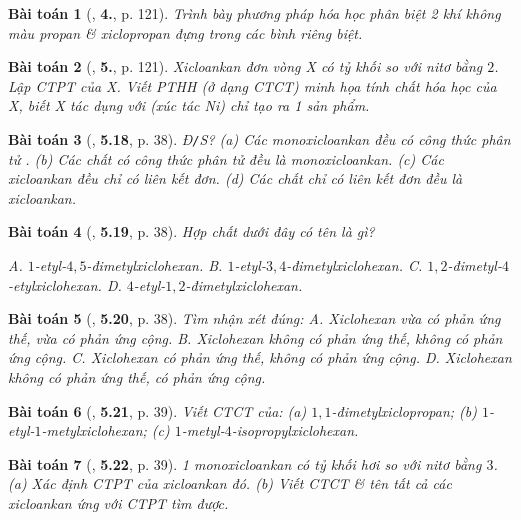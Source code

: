 \documentclass{article}
\numberwithin{equation}{section}
\newtheorem{baitoan}{Bài toán}[section]
\begin{document}
\begin{baitoan}[\cite{SGK_Hoa_Hoc_11_co_ban}, \textbf{4.}, p. 121]
	Trình bày phương pháp hóa học phân biệt 2 khí không màu propan \& xiclopropan đựng trong các bình riêng biệt.
\end{baitoan}

\begin{baitoan}[\cite{SGK_Hoa_Hoc_11_co_ban}, \textbf{5.}, p. 121]
	Xicloankan đơn vòng X có tỷ khối so với nitơ bằng $2$. Lập CTPT của X. Viết PTHH (ở dạng CTCT) minh họa tính chất hóa học của X, biết X tác dụng với \emph{} (xúc tác \emph{Ni}) chỉ tạo ra 1 sản phẩm.
\end{baitoan}

\begin{baitoan}[\cite{SBT_Hoa_Hoc_11_co_ban}, \textbf{5.18}, p. 38]
	\emph{Đ\texttt{/}S?} (a) Các monoxicloankan đều có công thức phân tử \emph{}. (b) Các chất có công thức phân tử \emph{} đều là monoxicloankan. (c) Các xicloankan đều chỉ có liên kết đơn. (d) Các chất chỉ có liên kết đơn đều là xicloankan.
\end{baitoan}

\begin{baitoan}[\cite{SBT_Hoa_Hoc_11_co_ban}, \textbf{5.19}, p. 38]
	Hợp chất dưới đây có tên là gì?
	\begin{center}
	\end{center}
	{\sf A.} $1$-etyl-$4,5$-đimetylxiclohexan. {\sf B.} $1$-etyl-$3,4$-đimetylxiclohexan. {\sf C.} $1,2$-đimetyl-$4$-etylxiclohexan. {\sf D.} $4$-etyl-$1,2$-đimetylxiclohexan.	
\end{baitoan}

\begin{baitoan}[\cite{SBT_Hoa_Hoc_11_co_ban}, \textbf{5.20}, p. 38]
	Tìm nhận xét đúng: {\sf A.} Xiclohexan vừa có phản ứng thế, vừa có phản ứng cộng. {\sf B.} Xiclohexan không có phản ứng thế, không có phản ứng cộng. {\sf C.} Xiclohexan có phản ứng thế, không có phản ứng cộng. {\sf D.} Xiclohexan không có phản ứng thế, có phản ứng cộng.
\end{baitoan}

\begin{baitoan}[\cite{SBT_Hoa_Hoc_11_co_ban}, \textbf{5.21}, p. 39]
	Viết CTCT của: (a) $1,1$-đimetylxiclopropan; (b) $1$-etyl-$1$-metylxiclohexan; (c) $1$-metyl-$4$-isopropylxiclohexan.
\end{baitoan}

\begin{baitoan}[\cite{SBT_Hoa_Hoc_11_co_ban}, \textbf{5.22}, p. 39]
	1 monoxicloankan có tỷ khối hơi so với nitơ bằng $3$. (a) Xác định CTPT của xicloankan đó. (b) Viết CTCT \& tên tất cả các xicloankan ứng với CTPT tìm được.
\end{baitoan}
\end{document}
